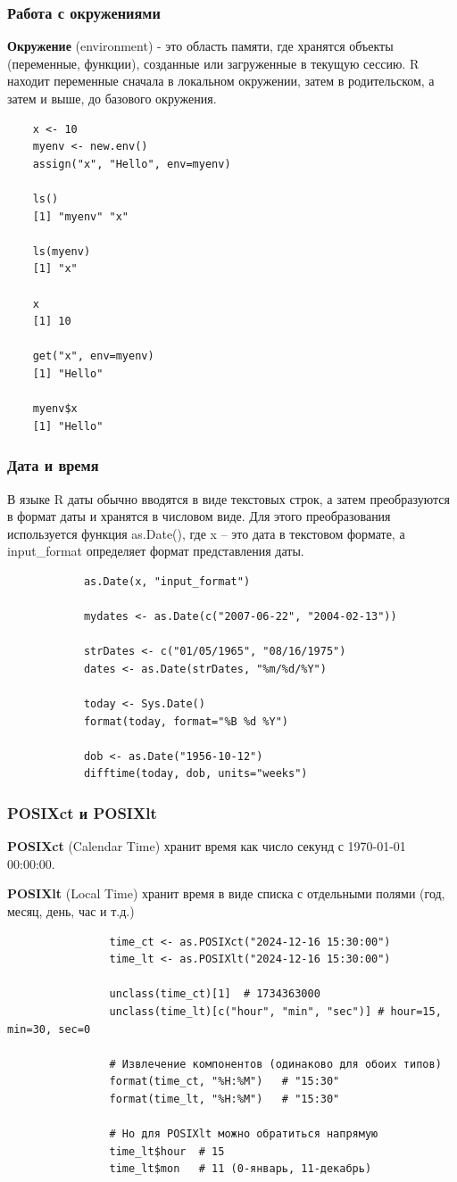 \documentclass[11pt,a4paper]{beamer}
\begin{document}
	
	\begin{frame}[fragile]
		\frametitle{Работа с окружениями}
		\textbf{Окружение} (environment) - это область памяти, где хранятся объекты (переменные, функции), созданные или загруженные в текущую сессию. R находит переменные сначала в локальном окружении, затем в родительском, а затем и выше, до базового окружения.
		{\fontsize{8}{8}\selectfont
			\begin{verbatim}
    x <- 10
    myenv <- new.env()
    assign("x", "Hello", env=myenv)

    ls()
    [1] "myenv" "x"

    ls(myenv)
    [1] "x"

    x
    [1] 10
				
    get("x", env=myenv)
    [1] "Hello"
    
    myenv$x
    [1] "Hello"
			\end{verbatim}
		}
	\end{frame}
	
	
	
	\begin{frame}[fragile]
		\frametitle{Дата и время}
		В языке R даты обычно вводятся в виде текстовых строк, а затем преобразуются в формат даты и хранятся в числовом виде. Для этого преобразования используется функция as.Date(), где x – это дата в текстовом формате, а input\_format определяет формат представления даты.
		{\fontsize{9}{10}\selectfont
		\begin{verbatim}
			as.Date(x, "input_format")
			
			mydates <- as.Date(c("2007-06-22", "2004-02-13"))
			
			strDates <- c("01/05/1965", "08/16/1975")
			dates <- as.Date(strDates, "%m/%d/%Y")
			
			today <- Sys.Date()
			format(today, format="%B %d %Y")
			
			dob <- as.Date("1956-10-12")
			difftime(today, dob, units="weeks")
		\end{verbatim} 	
	}
	\end{frame}
	
	
	
	\begin{frame}[fragile]
		\frametitle{POSIXct и POSIXlt}
		\textbf{POSIXct} (Calendar Time) хранит время как число секунд с 1970-01-01 00:00:00.
		
		\textbf{POSIXlt} (Local Time) хранит время в виде списка с отдельными полями (год, месяц, день, час и т.д.)
		{\fontsize{8}{9}\selectfont
			\begin{verbatim}
				time_ct <- as.POSIXct("2024-12-16 15:30:00")
				time_lt <- as.POSIXlt("2024-12-16 15:30:00")
				
				unclass(time_ct)[1]  # 1734363000
				unclass(time_lt)[c("hour", "min", "sec")] # hour=15, min=30, sec=0 
				
				# Извлечение компонентов (одинаково для обоих типов)
				format(time_ct, "%H:%M")   # "15:30"
				format(time_lt, "%H:%M")   # "15:30"
				
				# Но для POSIXlt можно обратиться напрямую
				time_lt$hour  # 15
				time_lt$mon   # 11 (0-январь, 11-декабрь)
			\end{verbatim} 	
		}
	\end{frame}
	
\end{document}
